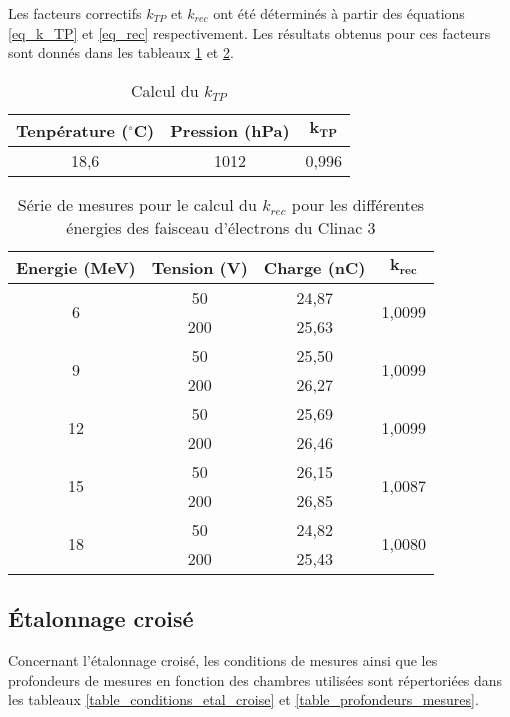 \documentclass{article}
\begin{document}
Les facteurs correctifs $k_{TP}$ et $k_{rec}$ ont été déterminés à partir des équations \ref*{eq_k_TP} et \ref*{eq_rec} respectivement. Les résultats obtenus pour ces facteurs sont donnés dans les tableaux \ref*{table_kTP} et \ref*{table_krec}.

\begin{table}[h]
  \centering
  \begin{tabular}{ccc}
    \toprule
    \textbf{Tenpérature (}$\mathbf{^{\circ}}$\textbf{C)} & \textbf{Pression (hPa)} & $\mathbf{k_{TP}}$ \\
    \toprule
    18,6 & 1012 & 0,996 \\
    \bottomrule
  \end{tabular}
  \caption{Calcul du $k_{TP}$}
  \label{table_kTP}
\end{table}

\begin{table}[h]
  \centering
  \begin{tabular}{cccc}
  \toprule
  \textbf{Energie (MeV)} & \textbf{Tension (V)} & \textbf{Charge (nC)} & $\mathbf{k_{rec}}$ \\ \toprule
  \multirow{2}{*}{6} & 50 & 24,87 & \multirow{2}{*}{1,0099} \\
   &200 & 25,63 &  \\ \hline
  \multirow{2}{*}{9} & 50 & 25,50 & \multirow{2}{*}{1,0099} \\
   &200 & 26,27 &  \\ \hline
  \multirow{2}{*}{12} & 50 & 25,69 & \multirow{2}{*}{1,0099} \\
   &200 & 26,46 &  \\ \hline  \multirow{2}{*}{15} &50 & 26,15 & \multirow{2}{*}{1,0087} \\
   &200 & 26,85 &  \\ \hline
  \multirow{2}{*}{18} & 50 & 24,82 & \multirow{2}{*}{1,0080} \\
   & 200 & 25,43 &  \\ \bottomrule
  \end{tabular}
  \caption{Série de mesures pour le calcul du $k_{rec}$ pour les différentes énergies des faisceau d'électrons du Clinac 3}
  \label{table_krec}
\end{table}

\subsection{Étalonnage croisé}

Concernant l'étalonnage croisé, les conditions de mesures ainsi que les profondeurs de mesures en fonction des chambres utilisées sont répertoriées dans les tableaux \ref*{table_conditions_etal_croise} et \ref*{table_profondeurs_mesures}.
\end{document}

